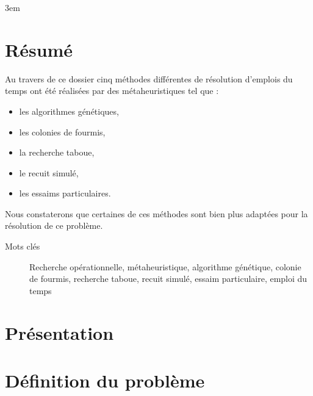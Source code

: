 \documentclass{librairies/lib}
\begin{document}
    \emergencystretch 3em

    


    \newpage
    \pagestyle{no_number}
    \section*{Résumé}


    Au travers de ce dossier cinq méthodes différentes de résolution d'emplois du temps ont été réalisées par des métaheuristiques tel que :
    \begin{itemize}
        \item les algorithmes génétiques,
        \item les colonies de fourmis,
        \item la recherche taboue,
        \item le recuit simulé,
        \item les essaims particulaires.
    \end{itemize}
    Nous constaterons que certaines de ces méthodes sont bien plus adaptées pour la résolution de ce problème.
    \begin{description}
        \item[Mots clés] Recherche opérationnelle, métaheuristique, algorithme génétique, colonie de fourmis, recherche taboue, recuit simulé, essaim particulaire, emploi du temps
    \end{description}

    \newpage



    \tableofcontents
    \newpage



    \pagestyle{number}


    \section{Présentation}\label{sec:presentation}

    


    \newpage


    \section{Définition du problème}\label{sec:definition-du-probleme}
\end{document}
